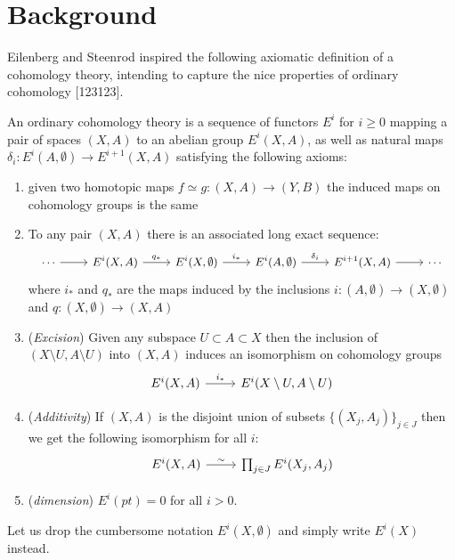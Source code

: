 
\chapter{Background}
\label{chapter1}
Eilenberg and Steenrod inspired the following
axiomatic definition of a cohomology
theory, intending to capture the
nice properties
of ordinary cohomology  [123123].
\begin{defn}
  An ordinary cohomology theory is a sequence of
  functors
  $E^i$ for $i\geq 0$ mapping a pair of
  spaces $(X,A)$ to an abelian group
  $E^i(X,A)$,
  as well as natural maps
  $\delta_i: E^i(A,\emptyset)
  \to E^{i+1}(X,A)$ satisfying
  the following axioms:
  \begin{enumerate}
  \item
    given two homotopic maps
    $f\simeq g:(X,A)\to (Y,B)$
    the induced maps on cohomology groups
    is the same
  \item
    To any pair $(X,A)$ there is
    an associated long exact sequence:
    \[
      \small
    \begin{tikzcd}
      \cdots \arrow[r]& E^{i}(X,A)\arrow[r,"q_*"]&
      E^{i}(X,\emptyset) \arrow[r,"i_*"]& E^i(A
      ,\emptyset)
      \arrow[r,"\delta_i"] &E^{i+1}(X,A)\arrow[r]&\cdots
    \end{tikzcd}
    \]
    where $i_*$ and $q_*$ are the maps induced
    by the inclusions $i: (A,\emptyset) \to
    (X,\emptyset)$ and $q: (X,\emptyset)\to (X,A)$
  \item 
    (\textit{Excision})
    Given any subspace $U\subset A \subset X$ then
    the inclusion of \\$(X\setminus U, A\setminus U)
    $ into $(X,A)$ induces an isomorphism on cohomology
    groups
    \[
      \begin{tikzcd}
        E^i(X,A)\arrow[r, "i_*"] & E^i(X\setminus U,
        A\setminus U)
      \end{tikzcd}
    \]
  \item (\textit{Additivity})
    If $(X,A)$ is the disjoint union of subsets
    $\{ (X_j,A_j) \}_{j\in J}$
    then we get the following isomorphism for all
    $i$:
    \[
      \begin{tikzcd}
        E^i(X,A)\arrow[r, "\sim"] & \prod_{j\in J}
        E^i(X_j,A_j)
      \end{tikzcd}
    \]
  \item
    (\textit{dimension}) $E^i(pt)=0$ for all $i>0$.
  \end{enumerate}
\end{defn}
Let us drop the cumbersome notation
$E^i(X,\emptyset)$ and simply write $E^i(X)$
instead. 

